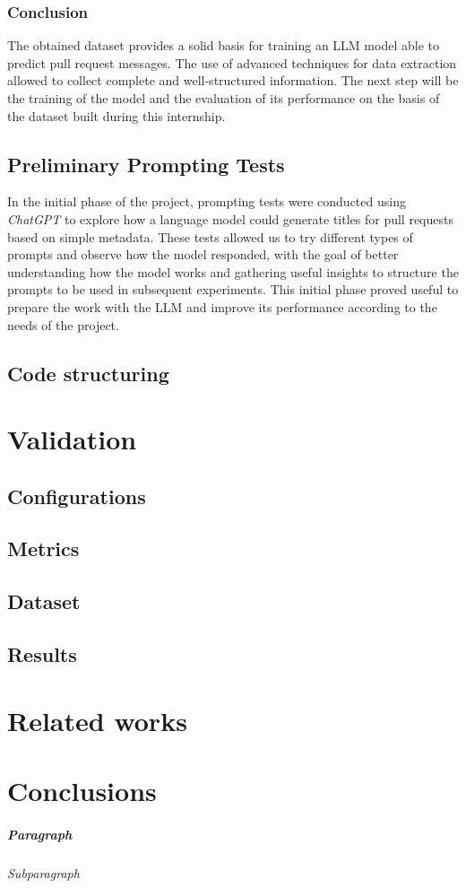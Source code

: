 \subsection{Conclusion}
The obtained dataset provides a solid basis for training an LLM model able to predict pull request messages. The use of advanced techniques for data extraction allowed to collect complete and well-structured information. The next step will be the training of the model and the evaluation of its performance on the basis of the dataset built during this internship.
\section{Preliminary Prompting Tests}
In the initial phase of the project, prompting tests were conducted using \textit{ChatGPT} to explore how a language model could generate titles for pull requests based on simple metadata. These tests allowed us to try different types of prompts and observe how the model responded, with the goal of better understanding how the model works and gathering useful insights to structure the prompts to be used in subsequent experiments. This initial phase proved useful to prepare the work with the LLM and improve its performance according to the needs of the project.
\section{Code structuring}

\chapter{Validation}
\section{Configurations}
\section{Metrics}
\section{Dataset}
\section{Results}
\chapter{Related works}
\chapter{Conclusions}


\paragraph{Paragraph}
\subparagraph{Subparagraph}